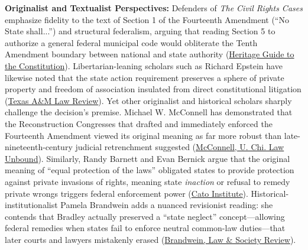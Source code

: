 \documentclass[12pt]{article}
\begin{document}
\textbf{Originalist and Textualist Perspectives:} Defenders of \textit{The Civil Rights Cases} emphasize fidelity to the text of Section 1 of the Fourteenth Amendment (``No State shall...'') and structural federalism, arguing that reading Section 5 to authorize a general federal municipal code would obliterate the Tenth Amendment boundary between national and state authority (\href{https://constitution.heritage.org/essays/amdt-14-s1-b/}{Heritage Guide to the Constitution}). Libertarian-leaning scholars such as Richard Epstein have likewise noted that the state action requirement preserves a sphere of private property and freedom of association insulated from direct constitutional litigation (\href{https://scholarship.law.tamu.edu/cgi/viewcontent.cgi?article=1359&context=lawreview}{Texas A\&M Law Review}). Yet other originalist and historical scholars sharply challenge the decision's premise. Michael W. McConnell has demonstrated that the Reconstruction Congresses that drafted and immediately enforced the Fourteenth Amendment viewed its original meaning as far more robust than late-nineteenth-century judicial retrenchment suggested (\href{https://chicagounbound.uchicago.edu/cgi/viewcontent.cgi?article=12612&context=journal_articles}{McConnell, U. Chi. Law Unbound}). Similarly, Randy Barnett and Evan Bernick argue that the original meaning of ``equal protection of the laws'' obligated states to provide protection against private invasions of rights, meaning state \textit{inaction} or refusal to remedy private wrongs triggers federal enforcement power (\href{https://www.cato.org/blog/new-decision-considers-federal-power-criminalize-civil-rights-violations}{Cato Institute}). Historical-institutionalist Pamela Brandwein adds a nuanced revisionist reading: she contends that Bradley actually preserved a ``state neglect'' concept---allowing federal remedies when states fail to enforce neutral common-law duties---that later courts and lawyers mistakenly erased (\href{https://www.cambridge.org/core/journals/law-and-society-review/article/judicial-abandonment-of-blacks-rethinking-the-state-action-cases-of-the-waite-court/6EFE4577A05FAA2791AB1541BFBFC371}{Brandwein, Law \& Society Review}).
\end{document}
